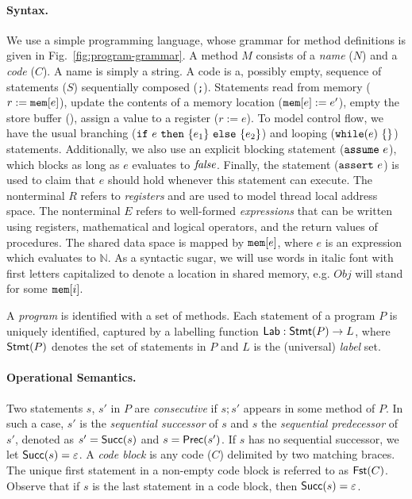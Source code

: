 \paragraph{Syntax.}
We use a simple programming language, whose grammar for method definitions is given in Fig.~\ref{fig:program-grammar}.
A method $M$ consists of a {\em name} ($N$) and a {\em code} ($C$).
A name is simply a string.
A code is a, possibly empty, sequence of statements ($S$) sequentially composed ({\tt ;}).
Statements read from memory ($r := \mathtt{mem}[e]$), update the contents of a memory location ($\mathtt{mem}[e] := e'$), empty the store buffer (\alifence), assign a value to a register ($r := e$).
To model control flow, we have the usual branching ($\mathtt{if}\ e\ \mathtt{then}\ \{e_1\}\ \mathtt{else}\ \{e_2\}$) and looping ($\aliwhilex e$) statements.
Additionally, we also use an explicit blocking statement ($\mathtt{assume}\ e$), which blocks as long as $e$ evaluates to $\mathit{false}$.
Finally, the statement ($\mathtt{assert}\ e$) is used to claim that $e$ should hold whenever this statement can execute.
The nonterminal $R$ refers to {\em registers} and are used to model thread local address space.
The nonterminal $E$ refers to well-formed {\em expressions} that can be written using registers, mathematical and logical operators, and the return values of procedures.
The shared data space is mapped by $\mathtt{mem}[e]$, where $e$ is an expression which evaluates to $\mathbb{N}$.
As a syntactic sugar, we will use words in italic font with first letters capitalized to denote a location in shared memory, e.g. $Obj$ will stand for some $\mathtt{mem}[i]$.

A {\em program} is identified with a set of methods.
Each statement of a program $P$ is uniquely identified, captured by a labelling function $\mathsf{Lab}: \mathsf{Stmt}(P) \rightarrow L$, where $\mathsf{Stmt}(P)$ denotes the set of statements in $P$ and $L$ is the (universal) {\em label} set.

\paragraph{Operational Semantics.}

Two statements $s$, $s'$ in $P$ are {\em consecutive} if $s\mathtt{;}s'$ appears in some method of $P$.
In such a case, $s'$ is the {\em sequential successor} of $s$ and $s$ the {\em sequential predecessor} of $s'$, denoted as $s'=\mathsf{Succ}(s)$ and $s=\mathsf{Prec}(s')$.
If $s$ has no sequential successor, we let $\mathsf{Succ}(s)=\varepsilon$.
A {\em code block} is any code ($C$) delimited by two matching braces.
The unique first statement in a non-empty code block is referred to as $\mathsf{Fst}(C)$.
Observe that if $s$ is the last statement in a code block, then $\mathsf{Succ}(s)=\varepsilon$.

